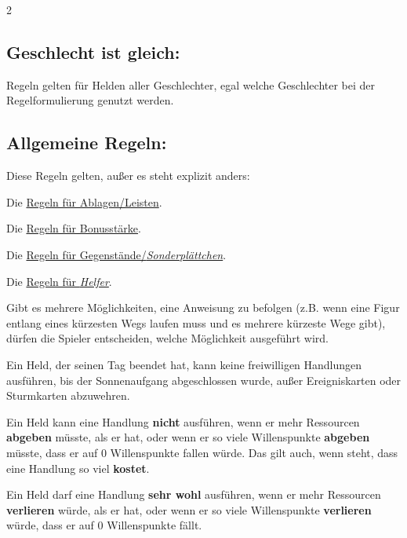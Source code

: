 \documentclass[10pt, a4paper, oneside]{book}
\newcommand{\fan}[1]{\textit{#1}}
\begin{document}
\begin{multicols*}{2}
\begin{nobgcolor}
\subsection{Geschlecht ist gleich:}

Regeln gelten für Helden aller Geschlechter, egal welche Geschlechter bei der Regelformulierung genutzt werden.
\supercite{DLvA:Losspiel-Anleitung,NH:Begleitheft,DlH:Losspiel-Anleitung,DH:Begleitheft,MH:Begleitheft,DeK:Losspiel-Anleitung,DfL:Losspiel-Anleitung}










\subsection{Allgemeine Regeln:}

Diese Regeln gelten, außer es steht explizit anders:

\bullet{} Die \hyperref[Ablagen und Leisten]{Regeln für Ablagen/Leisten}.

\bullet{} Die \hyperref[Bonusstärke]{Regeln für Bonusstärke}.

\bullet{} Die \hyperref[Gegenstände und Sonderplättchen]{Regeln für Gegenstände/\fan{Sonderplättchen}}.

\bullet{} Die \hyperref[Helfer]{Regeln für \fan{Helfer}}.

\bullet{} Gibt es mehrere Möglichkeiten, eine Anweisung zu befolgen (z.B. wenn eine Figur entlang eines kürzesten Wegs laufen muss und es mehrere kürzeste Wege gibt), dürfen die Spieler entscheiden, welche Möglichkeit ausgeführt wird.

\bullet{} Ein Held, der seinen Tag beendet hat, kann keine freiwilligen Handlungen ausführen, bis der Sonnenaufgang abgeschlossen wurde, außer Ereigniskarten oder Sturmkarten abzuwehren.
\supercite{32754,32768}

\bullet{} Ein Held kann eine Handlung \textbf{nicht} ausführen, wenn er mehr Ressourcen \textbf{abgeben} müsste, als er hat, oder wenn er so viele Willenspunkte \textbf{abgeben} müsste, dass er auf 0 Willenspunkte fallen würde. Das gilt auch, wenn steht, dass eine Handlung so viel \textbf{kostet}.

\bullet{} Ein Held darf eine Handlung \textbf{sehr wohl} ausführen, wenn er mehr Ressourcen \textbf{verlieren} würde, als er hat, oder wenn er so viele Willenspunkte \textbf{verlieren} würde, dass er auf 0 Willenspunkte fällt.


\end{nobgcolor}
\end{multicols*}
\end{document}
